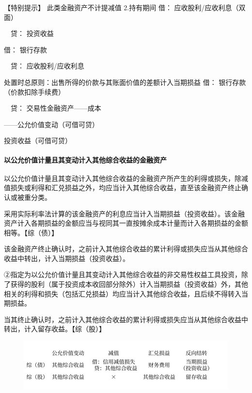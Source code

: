 \documentclass[UTF8,12pt]{ctexart}
\newenvironment{Dr}{\noindent 借：}{\par}
\newenvironment{Cr}{\noindent \ \ 贷：}{\par}
\numberwithin{equation}{section} %
\numberwithin{figure}{section}
\numberwithin{table}{section}
\begin{document}
	【特别提示】
	此类金融资产不计提减值
	2.持有期间
	\begin{Dr}
		应收股利/应收利息（双面）
	\end{Dr}
	\begin{Cr}
		投资收益
	\end{Cr}
	\begin{Dr}
		银行存款
	\end{Dr}
	\begin{Cr}
		应收股利/应收利息
	\end{Cr}

	
	处置时总原则：出售所得的价款与其账面价值的差额计入当期损益
	\begin{Dr}
		银行存款（价款扣除手续费）
	\end{Dr}
	\begin{Cr}
		交易性金融资产——成本
		
		——公允价值变动（可借可贷）
		
		投资收益（可借可贷）
	\end{Cr}	
	
	
	
	\paragraph{以公允价值计量且其变动计入其他综合收益的金融资产}
	以公允价值计量且其变动计入其他综合收益的金融资产所产生的利得或损失，除减值损失或利得和汇兑损益之外，均应当计入其他综合收益，直至该金融资产终止确认或被重分类。
	
	采用实际利率法计算的该金融资产的利息应当计入当期损益（投资收益）。该金融资产计入各期损益的金额应当与视同其一直按摊余成本计量而计入各期损益的金额相等。【综（债）】
	
	该金融资产终止确认时，之前计入其他综合收益的累计利得或损失应当从其他综合收益中转出，计入当期损益（投资收益）。
	
	②指定为以公允价值计量且其变动计入其他综合收益的非交易性权益工具投资，除了获得的股利（属于投资成本收回部分除外）计入当期损益（投资收益）外，其他相关的利得和损失（包括汇兑损益）均应当计入其他综合收益，且后续不得转入当期损益。
	
	当其终止确认时，之前计入其他综合收益的累计利得或损失应当从其他综合收益中转出，计入留存收益。【综（股）】
	\begin{figure}[h!]
		\centering
		\includegraphics[width=0.7\linewidth]{pic/screenshot001}
		\caption{}
		\label{fig:screenshot001}
	\end{figure}
\end{document}
